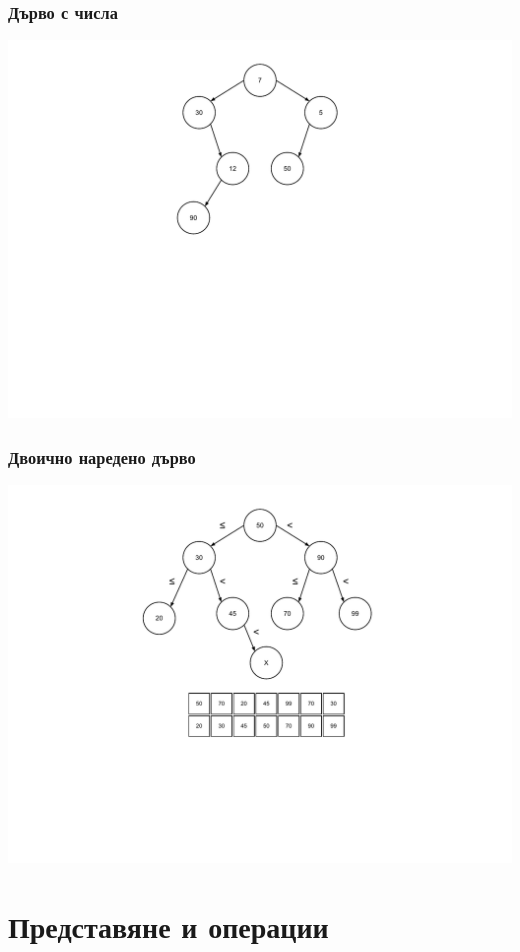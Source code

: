 \documentclass{beamer}
\begin{document}
\begin{frame}[fragile]
\frametitle{Дърво с числа}

\includegraphics[width=14cm]{images/tree_arbitrary}

\end{frame}


\begin{frame}[fragile]
\frametitle{Двоично наредено дърво}

\includegraphics[width=14cm]{images/tree_bot}

\end{frame}

\section{Представяне и операции}
\end{document}
